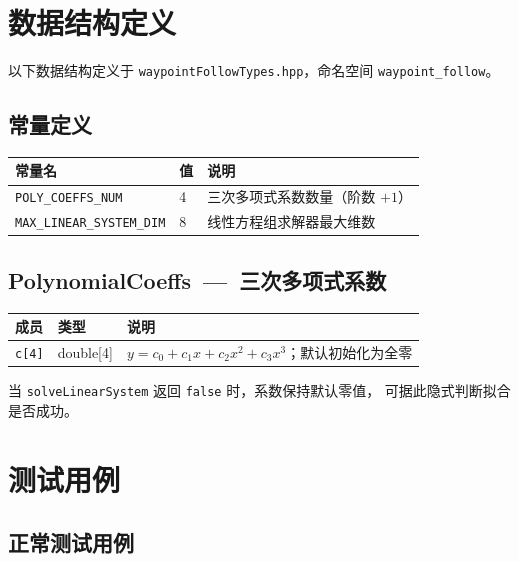 \documentclass[a4paper,10pt]{article}
\begin{document}
\section{数据结构定义}

以下数据结构定义于 \texttt{waypointFollowTypes.hpp}，命名空间 \texttt{waypoint\_follow}。

\subsection{常量定义}

\begin{longtable}{|L{5cm}|C{1.5cm}|L{8.5cm}|}
\hline
\textbf{常量名} & \textbf{值} & \textbf{说明} \\
\hline
\texttt{POLY\_COEFFS\_NUM} & 4 & 三次多项式系数数量（阶数 $+ 1$） \\
\hline
\texttt{MAX\_LINEAR\_SYSTEM\_DIM} & 8 & 线性方程组求解器最大维数 \\
\hline
\end{longtable}

\subsection{PolynomialCoeffs~---~三次多项式系数}

\begin{longtable}{|L{3.5cm}|C{2cm}|L{9.5cm}|}
\hline
\textbf{成员} & \textbf{类型} & \textbf{说明} \\
\hline
\texttt{c[4]} & double[4] & $y = c_0 + c_1 x + c_2 x^2 + c_3 x^3$；默认初始化为全零 \\
\hline
\end{longtable}

当 \texttt{solveLinearSystem} 返回 \texttt{false} 时，系数保持默认零值，
可据此隐式判断拟合是否成功。

\section{测试用例}

\subsection{正常测试用例}
\end{document}
